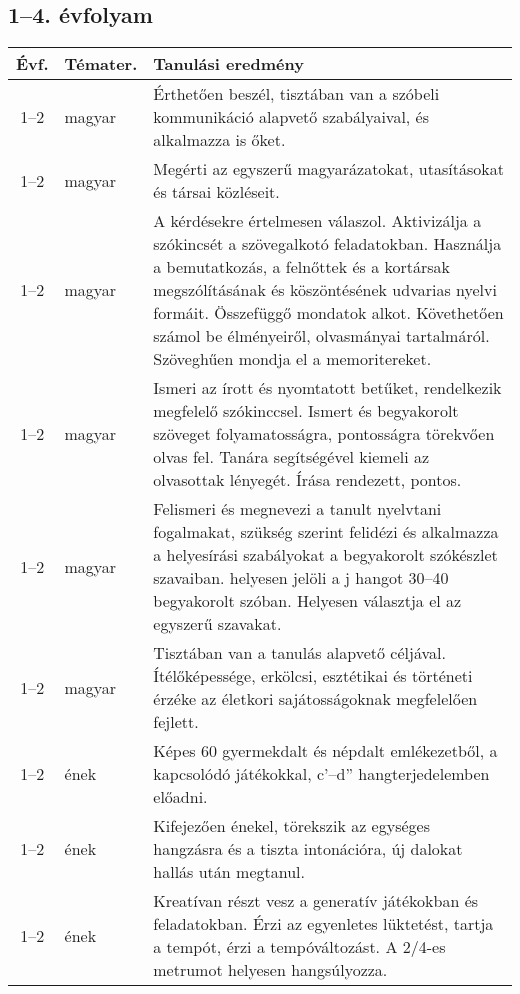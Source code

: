 \subsection{1--4. évfolyam}
\begin{small}
  \begin{longtable}{c | p{2cm} |  p{11cm} }
    \textbf{Évf.} & \textbf{Témater.} & \textbf{Tanulási eredmény} \\ \hline \hline
    \endhead

              1--2 & magyar & Érthetően beszél, tisztában van a szóbeli kommunikáció alapvető szabályaival, és alkalmazza is őket. \\ \hline
              1--2 & magyar & Megérti az egyszerű magyarázatokat, utasításokat és társai közléseit. \\ \hline
              1--2 & magyar & A kérdésekre értelmesen válaszol. Aktivizálja a szókincsét a szövegalkotó feladatokban. Használja a bemutatkozás, a felnőttek és a kortársak megszólításának és köszöntésének udvarias nyelvi formáit. Összefüggő mondatok alkot. Követhetően számol be élményeiről, olvasmányai tartalmáról. Szöveghűen mondja el a memoritereket. \\ \hline
              1--2 & magyar & Ismeri az írott és nyomtatott betűket, rendelkezik megfelelő szókinccsel. Ismert és begyakorolt szöveget folyamatosságra, pontosságra törekvően olvas fel. Tanára segítségével kiemeli az olvasottak lényegét. Írása rendezett, pontos. \\ \hline
              1--2 & magyar & Felismeri és megnevezi a tanult nyelvtani fogalmakat, szükség szerint felidézi és alkalmazza a helyesírási szabályokat a begyakorolt szókészlet szavaiban. helyesen jelöli a j hangot 30–40 begyakorolt szóban. Helyesen választja el az egyszerű szavakat. \\ \hline
              1--2 & magyar & Tisztában van a tanulás alapvető céljával. Ítélőképessége, erkölcsi, esztétikai és történeti érzéke az életkori sajátosságoknak megfelelően fejlett. \\ \hline
              1--2 & ének & Képes 60 gyermekdalt és népdalt emlékezetből, a kapcsolódó játékokkal, c’–d” hangterjedelemben előadni. \\ \hline
              1--2 & ének & Kifejezően énekel, törekszik az egységes hangzásra és a tiszta intonációra, új dalokat hallás után megtanul. \\ \hline
              1--2 & ének & Kreatívan részt vesz a generatív játékokban és feladatokban. Érzi az egyenletes lüktetést, tartja a tempót, érzi a tempóváltozást. A 2/4-es metrumot helyesen hangsúlyozza. \\ \hline

\end{longtable}
\end{small}
